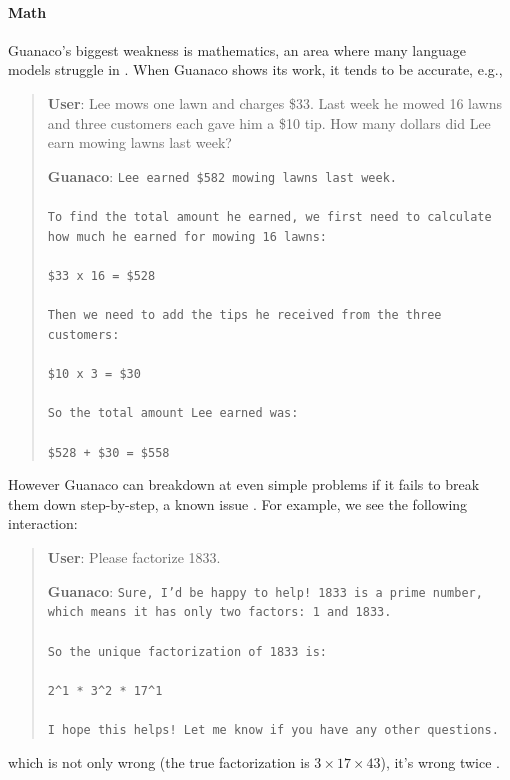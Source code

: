 \documentclass{article}
\newcommand{\bfmodel}{\textbf{Guanaco}\xspace}
\newcommand{\model}{{Guanaco}\xspace}
\begin{document}
\paragraph{Math} \model's biggest weakness is mathematics, an area where many language models struggle in \citep{liang2022holistic}. When \model shows its work, it tends to be accurate, e.g.,

\begin{quote}
    \textbf{User}: Lee mows one lawn and charges \$33. Last week he mowed 16 lawns and three customers each gave him a \$10 tip. How many dollars did Lee earn mowing lawns last week?

    \bfmodel: \texttt{Lee earned \$582 mowing lawns last week. \\ \\ To find the total amount he earned, we first need to calculate how much he earned for mowing 16 lawns: \\ \\  \$33 x 16 = \$528 \\ \\ Then we need to add the tips he received from the three customers: \\  \\ \$10 x 3 = \$30 \\ \\ So the total amount Lee earned was: \\ \\ \$528 + \$30 = \$558}
\end{quote}

However \model can breakdown at even simple problems if it fails to break them down step-by-step, a known issue \cite{weichain}. For example, we see the following interaction:
\begin{quote}
    \textbf{User}: Please factorize 1833.

    \bfmodel: \texttt{Sure, I'd be happy to help! 1833 is a prime number, which means it has only two factors: 1 and 1833. \\ \\ So the unique factorization of 1833 is: \\ \\ 2\^{}1 * 3\^{}2 * 17\^{}1 \\ \\ I hope this helps! Let me know if you have any other questions.}
\end{quote}
which is not only wrong (the true factorization is $3 \times 17 \times 43$), it's wrong twice .
\end{document}
